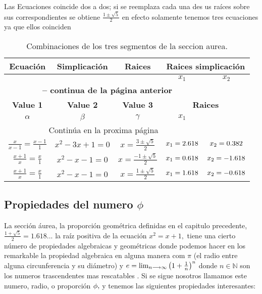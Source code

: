 Las Ecuaciones coincide dos a dos; si se reemplaza cada una des us raíces sobre sus correspondientes   se obtiene $\frac{1\pm\sqrt{5}}{2}$ en efecto solamente tenemos tres ecuaciones ya que ellos coinciden

\begin{longtable}{ccccc}
	\caption{Combinaciones de los tres segmentos de la seccion aurea.}
	\label{tab:w1wwwww}\\
	\toprule
	\textbf{Ecuación} & \textbf{Simplicación} & \textbf{Raices}& \multicolumn{2}{c}{\textbf{Raices simplicación}}\\\midrule
	 &  &  & $x_1$ & $x_2$ \\
	\midrule
	\endfirsthead %
 \multicolumn{4}{c}{{\bfseries \tablename\ \thetable{} -- continua de la página anterior}} \\
	\toprule
	\textbf{Value 1} & \textbf{Value 2} & \textbf{Value 3}& \multicolumn{2}{c}{\textbf{Raices}}\\\midrule
	$\alpha$ & $\beta$ & $\gamma$ & $x_1$ \\
	\midrule
	\endhead
	\multicolumn{4}{c}{{Continúa en la proxima página}} \\ \midrule
	\endfoot
	\bottomrule
	\endlastfoot
	$\frac{x}{x-1}=\frac{x-1}{1}$&$ x^2-3x+1=0 $ & $x=\frac{3\pm\sqrt{5}}{2}$  & $x_1=\fpeval{round((3+sqrt(5))/2,3)}$ & $x_2=\fpeval{round((3-sqrt(5))/2,3)}$\\\midrule
	$\frac{x+1}{x}=\frac{x}{1}$&$ x^2-x-1=0$     & $x=\frac{-1\pm\sqrt{5}}{2}$  & $x_1=\fpeval{round((-1+sqrt(5))/2,3)}$ & $x_2=\fpeval{round((-1-sqrt(5))/2,3)}$\\\midrule
	$\frac{x+1}{x}=\frac{x}{1}$&$ x^2-x-1=0$     & $x=\frac{1\pm\sqrt{5}}{2}$  & $x_1=\fpeval{round((1+sqrt(5))/2,3)}$ & $x_2=\fpeval{round((1-sqrt(5))/2,3)}$\\
\end{longtable}


\subsection{Propiedades del numero $\phi$}

La sección áurea, la proporción geométrica definidas en el capitulo precedente, $\frac{1+\sqrt{5}}{2}=1.618...$ la raíz positiva de la ecuación $x^2=x+1,$ tiene una cierto número de propiedades  algebraicas  y geométricas   donde podemos hacer en los remarkable la propiedad algebraica  en alguna manera  com $\pi$ (el radio entre alguna circunferencia y su diámetro) y $e=\lim_{n\longrightarrow \infty}\left(1+\frac{1}{n}\right)^n$ donde $n\in \mathbb{N}$ son los numeros trascendentes  mas rescatables  .
Si  se sigue nosotros llamamos este numero, radio, o proporción $\phi,$  y tenemos las siguientes propiedades interesantes:

